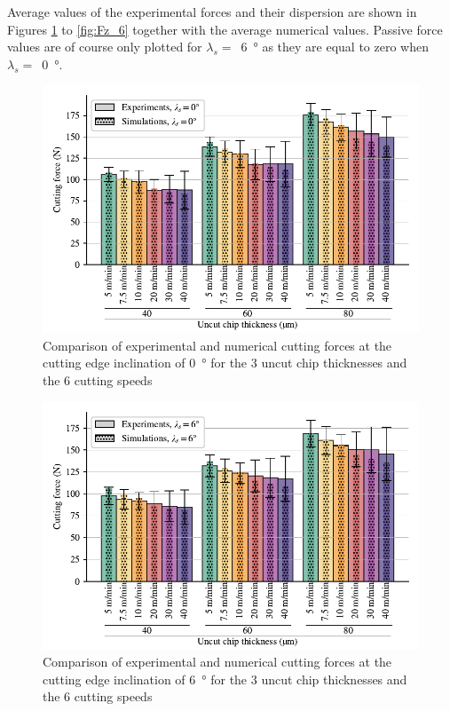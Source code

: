 \documentclass[preprint,12pt,times]{elsarticle}
\begin{document}
Average values of the experimental forces and their dispersion are shown in Figures \ref{fig:Fx_0} to \ref{fig:Fz_6} together with the average numerical values. Passive force values are of course only plotted for $\lambda_s =$~\qty{6}{\degree} as they are equal to zero when $\lambda_s =$~\qty{0}{\degree}.

\begin{figure}[!h]
\centering
\includegraphics[width = 140 mm]{Figures/Fx_0}
\caption{Comparison of experimental and numerical cutting forces at the cutting edge inclination of \qty{0}{\degree} for the 3 uncut chip thicknesses and the 6 cutting speeds}
\label{fig:Fx_0}
\end{figure}

\begin{figure}[!h]
\centering
\includegraphics[width = 140 mm]{Figures/Fx_6}
\caption{Comparison of experimental and numerical cutting forces at the cutting edge inclination of \qty{6}{\degree} for the 3 uncut chip thicknesses and the 6 cutting speeds}
\label{fig:Fx_6}
\end{figure}
\end{document}
